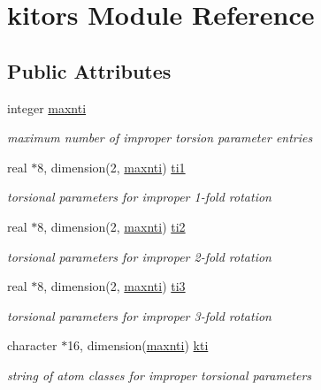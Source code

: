 \hypertarget{classkitors}{\section{kitors Module Reference}
\label{classkitors}
}
\subsection*{Public Attributes}
\begin{DoxyCompactItemize}
\item 
integer \hyperlink{classkitors_aa0169a31241c5476adff2877e35702d2}{maxnti}
\begin{DoxyCompactList}\small\item\em maximum number of improper torsion parameter entries \end{DoxyCompactList}\item 
real $\ast$8, dimension(2, \hyperlink{classkitors_aa0169a31241c5476adff2877e35702d2}{maxnti}) \hyperlink{classkitors_af3a23286166131a2ba254e4c52a79271}{ti1}
\begin{DoxyCompactList}\small\item\em torsional parameters for improper 1-\/fold rotation \end{DoxyCompactList}\item 
real $\ast$8, dimension(2, \hyperlink{classkitors_aa0169a31241c5476adff2877e35702d2}{maxnti}) \hyperlink{classkitors_a25ca877a63bcba26a3e4ac2dd8b46c90}{ti2}
\begin{DoxyCompactList}\small\item\em torsional parameters for improper 2-\/fold rotation \end{DoxyCompactList}\item 
real $\ast$8, dimension(2, \hyperlink{classkitors_aa0169a31241c5476adff2877e35702d2}{maxnti}) \hyperlink{classkitors_a150f6f9b432aaa18bab41726cb910d19}{ti3}
\begin{DoxyCompactList}\small\item\em torsional parameters for improper 3-\/fold rotation \end{DoxyCompactList}\item 
character $\ast$16, dimension(\hyperlink{classkitors_aa0169a31241c5476adff2877e35702d2}{maxnti}) \hyperlink{classkitors_ad580d974a26e62c40b0e0916ba8ca99d}{kti}
\begin{DoxyCompactList}\small\item\em string of atom classes for improper torsional parameters \end{DoxyCompactList}\end{DoxyCompactItemize}


